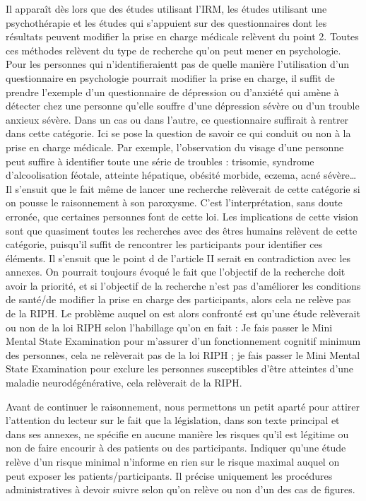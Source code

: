 \documentclass[
  12pt,
]{book}
\begin{document}
Il apparaît dès lors que des études utilisant l'IRM, les études utilisant une psychothérapie et les études qui s'appuient sur des questionnaires dont les résultats peuvent modifier la prise en charge médicale relèvent du point 2. Toutes ces méthodes relèvent du type de recherche qu'on peut mener en psychologie. Pour les personnes qui n'identifieraientt pas de quelle manière l'utilisation d'un questionnaire en psychologie pourrait modifier la prise en charge, il suffit de prendre l'exemple d'un questionnaire de dépression ou d'anxiété qui amène à détecter chez une personne qu'elle souffre d'une dépression sévère ou d'un trouble anxieux sévère. Dans un cas ou dans l'autre, ce questionnaire suffirait à rentrer dans cette catégorie. Ici se pose la question de savoir ce qui conduit ou non à la prise en charge médicale. Par exemple, l'observation du visage d'une personne peut suffire à identifier toute une série de troubles : trisomie, syndrome d'alcoolisation féotale, atteinte hépatique, obésité morbide, eczema, acné sévère\ldots{} Il s'ensuit que le fait même de lancer une recherche relèverait de cette catégorie si on pousse le raisonnement à son paroxysme. C'est l'interprétation, sans doute erronée, que certaines personnes font de cette loi. Les implications de cette vision sont que quasiment toutes les recherches avec des êtres humains relèvent de cette catégorie, puisqu'il suffit de rencontrer les participants pour identifier ces éléments. Il s'ensuit que le point d de l'article II serait en contradiction avec les annexes. On pourrait toujours évoqué le fait que l'objectif de la recherche doit avoir la priorité, et si l'objectif de la recherche n'est pas d'améliorer les conditions de santé/de modifier la prise en charge des participants, alors cela ne relève pas de la RIPH. Le problème auquel on est alors confronté est qu'une étude relèverait ou non de la loi RIPH selon l'habillage qu'on en fait : Je fais passer le Mini Mental State Examination \citep{Folstein1975} pour m'assurer d'un fonctionnement cognitif minimum des personnes, cela ne relèverait pas de la loi RIPH ; je fais passer le Mini Mental State Examination \citep{Folstein1975} pour exclure les personnes susceptibles d'être atteintes d'une maladie neurodégénérative, cela relèverait de la RIPH.

Avant de continuer le raisonnement, nous permettons un petit aparté pour attirer l'attention du lecteur sur le fait que la législation, dans son texte principal et dans ses annexes, ne spécifie en aucune manière les risques qu'il est légitime ou non de faire encourir à des patients ou des participants. Indiquer qu'une étude relève d'un risque minimal n'informe en rien sur le risque maximal auquel on peut exposer les patients/participants. Il précise uniquement les procédures administratives à devoir suivre selon qu'on relève ou non d'un des cas de figures.
\end{document}
